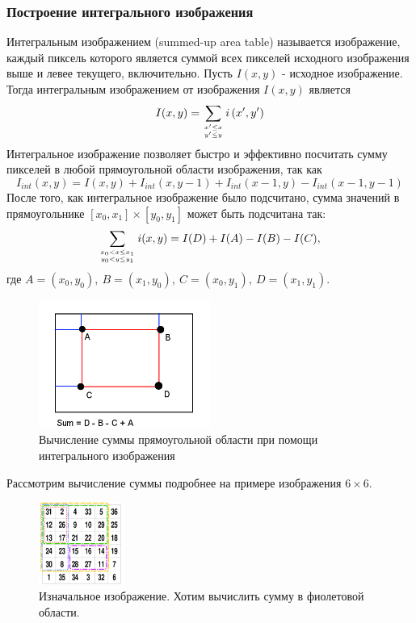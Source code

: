 \subsubsection{Построение интегрального изображения}
Интегральным изображением (summed-up area table) называется изображение, каждый пиксель которого является суммой всех пикселей исходного изображения выше и левее текущего, включительно. Пусть $I(x, y)$ - исходное изображение. Тогда интегральным изображением от изображения $I(x, y)$ является
$$
I(x, y)=\sum_{x^{\prime} \leq x \atop y^{\prime} \leq y} i\left(x^{\prime}, y^{\prime}\right)
$$
Интегральное изображение позволяет быстро и эффективно посчитать сумму пикселей в любой прямоугольной области изображения, так как
$$
I_{int}(x, y)=I(x, y)+I_{int}(x, y-1)+I_{int}(x-1, y)-I_{int}(x-1, y-1)
$$
После того, как интегральное изображение было подсчитано, сумма значений в прямоугольнике $[x_0, x_1] \times [y_0, y_1]$ может быть подсчитана так:
$$
\sum_{x_{0}<x \leq x_{1} \atop y_{0}<y \leq y_{1}} i(x, y)=I(D)+I(A)-I(B)-I(C),
$$
где $A=(x_0, y_0),~B=(x_1, y_0),~C=(x_0, y_1),~D=(x_1, y_1).$
\newline
\begin{figure}[H]
    \centering
    \includegraphics[width=0.5\textwidth]{pics/Summed_area_table.png}
    \caption{Вычисление суммы прямоугольной области при помощи интегрального изображения}
    \label{fig:summed0}
\end{figure}
\newpage
Рассмотрим вычисление суммы подробнее на примере изображения $6 \times 6$.
\newline
\begin{figure}[H]
    \centering
    \includegraphics[width=0.25\textwidth]{pics/summedup1.png}
    \caption{Изначальное изображение. Хотим вычислить сумму в фиолетовой области.}
    \label{fig:summed1}
\end{figure}
